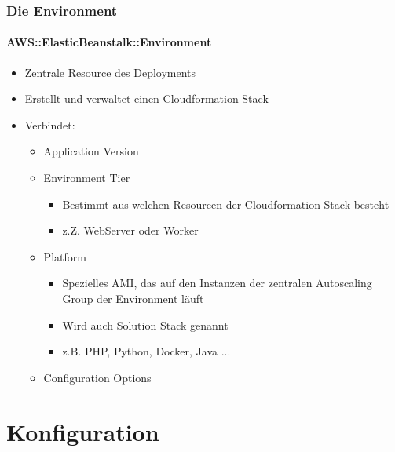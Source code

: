 \documentclass[aspectratio=169,grey,smaller]{beamer}
\begin{document}
\begin{frame}
  \frametitle{Die Environment}
  \framesubtitle{AWS::ElasticBeanstalk::Environment}
  \begin{itemize}
  \item<2-> Zentrale Resource des Deployments
  \item<3-> Erstellt und verwaltet einen Cloudformation Stack
  \item<4-> Verbindet:
    \begin{itemize}
    \item<4-> Application Version
    \item<5-> Environment Tier
      \begin{itemize}
      \item Bestimmt aus welchen Resourcen der Cloudformation Stack besteht
      \item z.Z. WebServer oder Worker
      \end{itemize}
    \item<6-> Platform 
      \begin{itemize}
      \item Spezielles AMI, das auf den Instanzen der zentralen Autoscaling Group der Environment läuft
      \item Wird auch Solution Stack genannt
      \item z.B. PHP, Python, Docker, Java ...
      \end{itemize}
    \item<7-> Configuration Options
    \end{itemize}
  \end{itemize}
\end{frame}


\section{Konfiguration}
\subsection{}
\end{document}
